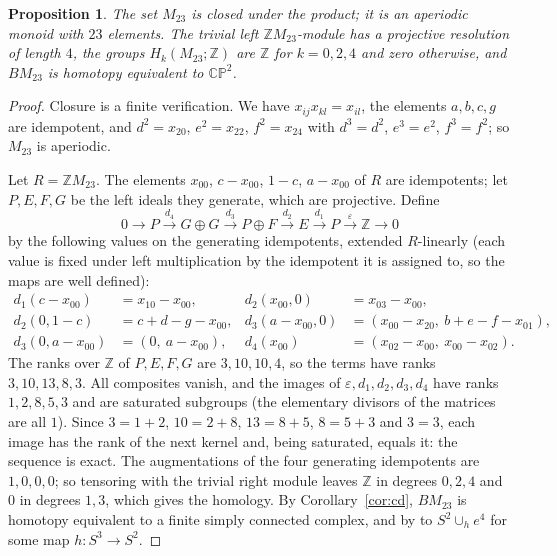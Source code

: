 \documentclass[11pt,a4paper]{article}
\newtheorem{proposition}[theorem]{Proposition}
\theoremstyle{definition}
\newcommand{\Z}{\mathbb{Z}}
\newcommand{\CP}{\mathbb{CP}}
\begin{document}
\begin{proposition}\label{prop:M23}
The set $M_{23}$ is closed under the product; it is an aperiodic monoid with
$23$ elements. The trivial left $\Z M_{23}$-module has a projective
resolution of length $4$, the groups $H_k(M_{23};\Z)$ are $\Z$ for
$k=0,2,4$ and zero otherwise, and $BM_{23}$ is homotopy equivalent to
$\CP^2$.
\end{proposition}

\begin{proof}
Closure is a finite verification. We have $x_{ij}x_{kl}=x_{il}$, the
elements $a,b,c,g$ are idempotent, and $d^2=x_{20}$, $e^2=x_{22}$,
$f^2=x_{24}$ with $d^3=d^2$, $e^3=e^2$, $f^3=f^2$; so $M_{23}$ is aperiodic.

Let $R=\Z M_{23}$. The elements $x_{00}$, $c-x_{00}$, $1-c$, $a-x_{00}$ of
$R$ are idempotents; let $P,E,F,G$ be the left ideals they generate, which
are projective. Define
\[
 0\to P\xrightarrow{d_4}G\oplus G\xrightarrow{d_3}P\oplus F
 \xrightarrow{d_2}E\xrightarrow{d_1}P\xrightarrow{\varepsilon}\Z\to0
\]
by the following values on the generating idempotents, extended
$R$-linearly (each value is fixed under left multiplication by the
idempotent it is assigned to, so the maps are well defined):
\[
\begin{aligned}
 d_1(c-x_{00})&=x_{10}-x_{00}, &
 d_2(x_{00},0)&=x_{03}-x_{00},\\
 d_2(0,1-c)&=c+d-g-x_{00}, &
 d_3(a-x_{00},0)&=(x_{00}-x_{20},\ b+e-f-x_{01}),\\
 d_3(0,a-x_{00})&=(0,\ a-x_{00}), &
 d_4(x_{00})&=(x_{02}-x_{00},\ x_{00}-x_{02}).
\end{aligned}
\]
The ranks over $\Z$ of $P,E,F,G$ are $3,10,10,4$, so the terms have ranks
$3,10,13,8,3$. All composites vanish, and the images of
$\varepsilon,d_1,d_2,d_3,d_4$ have ranks $1,2,8,5,3$ and are saturated
subgroups (the elementary divisors of the matrices are all $1$). Since
$3=1+2$, $10=2+8$, $13=8+5$, $8=5+3$ and $3=3$, each image has the rank of
the next kernel and, being saturated, equals it: the sequence is exact.
The augmentations of the four generating idempotents are $1,0,0,0$; so
tensoring with the trivial right module leaves $\Z$ in degrees $0,2,4$ and
$0$ in degrees $1,3$, which gives the homology. By Corollary~\ref{cor:cd},
$BM_{23}$ is homotopy equivalent to a finite simply connected complex, and
by \cite[Proposition~4C.1]{Ha} to $S^2\cup_he^4$ for some map
$h\colon S^3\to S^2$.


\end{proof}
\end{document}
